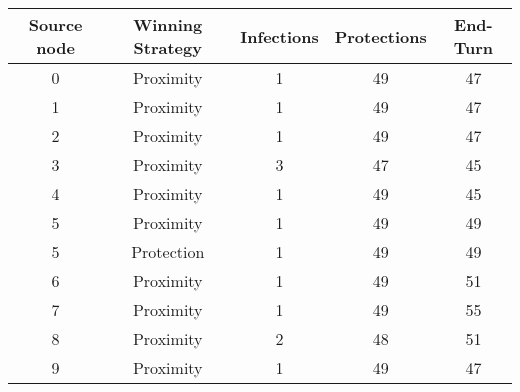 \documentclass[results.tex]{subfiles}
\begin{document}
    \begin{center}
        \begin{tabular}{| c || c | c | c | c |}
            \hline
            {\bfseries Source node} & {\bfseries Winning Strategy} & {\bfseries Infections} & {\bfseries Protections}
            & {\bfseries End-Turn}
            \\  %
            \hline\hline
            0                       & Proximity                    & 1                      & 49                      & 47                   \\
            \hline
            1                       & Proximity                    & 1                      & 49                      & 47                   \\
            \hline
            2                       & Proximity                    & 1                      & 49                      & 47                   \\
            \hline
            3                       & Proximity                    & 3                      & 47                      & 45                   \\
            \hline
            4                       & Proximity                    & 1                      & 49                      & 45                   \\
            \hline
            5                       & Proximity                    & 1                      & 49                      & 49                   \\
            \hline
            5                       & Protection                   & 1                      & 49                      & 49                   \\
            \hline
            6                       & Proximity                    & 1                      & 49                      & 51                   \\
            \hline
            7                       & Proximity                    & 1                      & 49                      & 55                   \\
            \hline
            8                       & Proximity                    & 2                      & 48                      & 51                   \\
            \hline
            9                       & Proximity                    & 1                      & 49                      & 47                   \\

\end{tabular}
\end{center}
\end{document}
